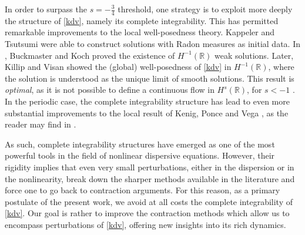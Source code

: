 \documentclass[%
11pt,  reqno]{amsart}
\newcommand{\5}{\textup{V}}
\newcommand{\dx}{\partial_x}
\newcommand{\jp}{\color{orange}}
\theoremstyle{remark}
\newcommand{\R}{\mathbb{R}}
\numberwithin{equation}{section}
\numberwithin{theorem}{section}
\begin{document}
\medskip

In order to surpass the $s=-\frac34$ threshold, one strategy is to exploit more deeply the structure of \eqref{kdv}, namely its complete integrability. This has permitted remarkable improvements to the local well-posedness theory. Kappeler \cite{Kappeler_rough} and Tsutsumi \cite{Tsutsumi_kdv_measures} were able to construct solutions with Radon measures as initial data. In \cite{BuckmasterKoch}, Buckmaster and Koch proved the existence of $H^{-1}(\R)$ weak solutions. Later, Killip and Visan \cite{KillipVisan_kdv} showed the (global) well-posedness of \eqref{kdv} in $H^{-1}(\R)$, where the solution is understood as the unique limit of smooth solutions. This result is \emph{optimal}, as it is not possible to define a continuous flow in $H^s(\R)$, for $s<-1$ \cite{Molinet_ill_line}. In the periodic case, the complete integrability structure has lead to even more substantial improvements to the  local result of Kenig, Ponce and Vega \cite{kpv_bilin}, {as the reader may find in }\cite{KMMT16, KappelerMolnar18, KT06, KillipVisan_kdv}.

	
	\medskip

    
	As such, complete integrability structures have emerged as one of the most powerful tools in the field of nonlinear dispersive equations. However, their rigidity implies that even very small perturbations, either in the dispersion or in the nonlinearity, break down the sharper methods available in the literature and force one to go back to contraction arguments. 
    For this reason, {as a primary postulate of the present work,} we avoid at all costs the complete integrability of \eqref{kdv}. Our goal is {\jp rather to improve the contraction methods which allow us to encompass perturbations of \eqref{kdv}, offering new insights into its rich dynamics.}
\end{document}
